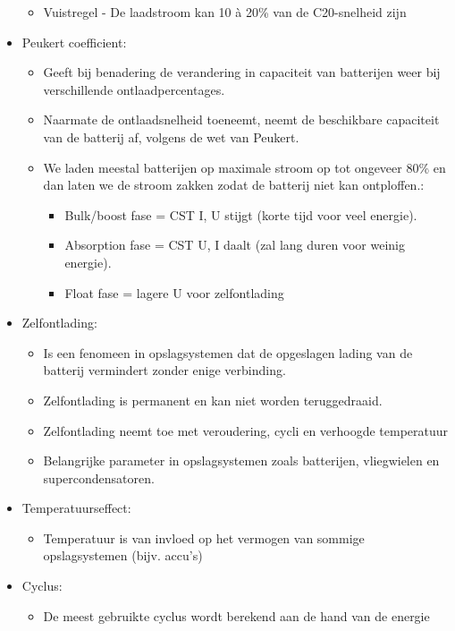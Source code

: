 \documentclass[12pt]{article}
\begin{document}
\begin{itemize}
\begin{itemize}
        \item Vuistregel - De laadstroom kan 10 à 20\% van de C20-snelheid zijn
    \end{itemize}
    \item Peukert coefficient:\begin{itemize}
        \item Geeft bij benadering de verandering in capaciteit van batterijen weer bij verschillende ontlaadpercentages. 
        \item Naarmate de ontlaadsnelheid toeneemt, neemt de beschikbare capaciteit van de batterij af, volgens de wet van Peukert. 
        \item We laden meestal batterijen op maximale stroom op tot ongeveer 80\% en dan laten we de stroom zakken zodat de batterij niet kan ontploffen.:\begin{itemize}
            \item Bulk/boost fase = CST I, U stijgt (korte tijd voor veel energie).
            \item Absorption fase = CST U, I daalt (zal lang duren voor weinig energie).
            \item Float fase = lagere U voor zelfontlading
        \end{itemize}
    \end{itemize}
    \item Zelfontlading:\begin{itemize}
        \item Is een fenomeen in opslagsystemen dat de opgeslagen lading van de batterij vermindert zonder enige verbinding. 
        \item Zelfontlading is permanent en kan niet worden teruggedraaid. 
        \item Zelfontlading neemt toe met veroudering, cycli en verhoogde temperatuur 
        \item Belangrijke parameter in opslagsystemen zoals batterijen, vliegwielen en supercondensatoren.
    \end{itemize}
    \item Temperatuurseffect:\begin{itemize}
        \item Temperatuur is van invloed op het vermogen van sommige opslagsystemen (bijv. accu's)
    \end{itemize}
    \item Cyclus:\begin{itemize}
        \item De meest gebruikte cyclus wordt berekend aan de hand van de energie

\end{itemize}
\end{itemize}
\end{document}
